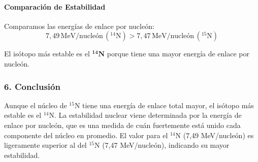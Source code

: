 \paragraph*{Comparación de Estabilidad}
Comparamos las energías de enlace por nucleón:
$$7,49 \, \text{MeV/nucleón} \, ({}^{14}\text{N}) > 7,47 \, \text{MeV/nucleón} \, ({}^{15}\text{N})$$
\begin{cajaresultado}
    El isótopo más estable es el $\boldsymbol{{}^{14}\textbf{N}}$ porque tiene una mayor energía de enlace por nucleón.
\end{cajaresultado}

\subsubsection*{6. Conclusión}
\begin{cajaconclusion}
Aunque el núcleo de ${}^{15}\text{N}$ tiene una energía de enlace total mayor, el isótopo más estable es el ${}^{14}\text{N}$. La estabilidad nuclear viene determinada por la energía de enlace por nucleón, que es una medida de cuán fuertemente está unido cada componente del núcleo en promedio. El valor para el ${}^{14}\text{N}$ (7,49 MeV/nucleón) es ligeramente superior al del ${}^{15}\text{N}$ (7,47 MeV/nucleón), indicando su mayor estabilidad.
\end{cajaconclusion}

\newpage

